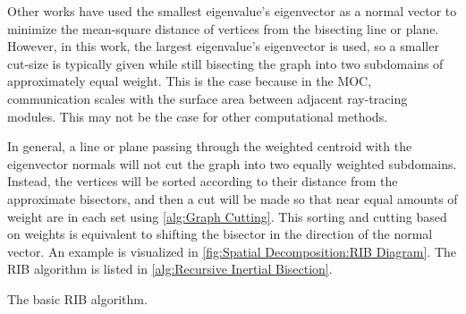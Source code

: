 {{{{        Other works \cite{Elsner1997,Floros1995} have used the smallest eigenvalue's eigenvector as a normal vector to minimize the mean-square distance of vertices from the bisecting line or plane.
        However, in this work, the largest eigenvalue's eigenvector is used, so a smaller cut-size is typically given while still bisecting the graph into two subdomains of approximately equal weight.
        This is the case because in the \ac{MOC}, communication scales with the surface area between adjacent ray-tracing modules.
        This may not be the case for other computational methods.

        In general, a line or plane passing through the weighted centroid with the eigenvector normals will not cut the graph into two equally weighted subdomains.
        Instead, the vertices will be sorted according to their distance from the approximate bisectors, and then a cut will be made so that near equal amounts of weight are in each set using \cref{alg:Graph Cutting}.
        This sorting and cutting based on weights is equivalent to shifting the bisector in the direction of the normal vector.
        An example is visualized in \cref{fig:Spatial Decomposition:RIB Diagram}.
        The \ac{RIB} algorithm is listed in \cref{alg:Recursive Inertial Bisection}.

        \begin{algorithm}
          \centering
          \caption{The basic \acf{RIB} algorithm.}
          \label{alg:Recursive Inertial Bisection}
          \begin{algorithmic}[1]
               
            \EndProcedure
          \end{algorithmic}
        \end{algorithm}

}}}}
